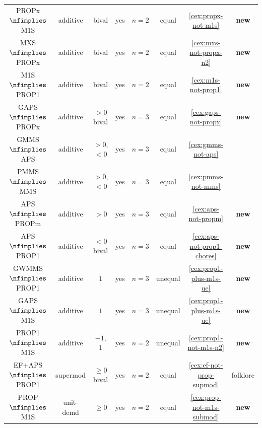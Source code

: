\begin{longtable}{cccccccc}
\\[\defaultaddspace] PROPx $\nfimplies$ M1S
    & additive & bival & yes & $n=2$ & equal & \cref{cex:propx-not-m1s} & \textbf{new}
\\[\defaultaddspace] MXS $\nfimplies$ PROPx
    & additive & bival & yes & $n=2$ & equal & \cref{cex:mxs-not-propx-n2} & \textbf{new}
\\[\defaultaddspace] M1S $\nfimplies$ PROP1
    & additive & bival & yes & $n=2$ & equal & \cref{cex:m1s-not-prop1} & \textbf{new}
%
\\\midrule GAPS $\nfimplies$ PROPx
    & additive & $> 0$ bival & yes & $n=3$ & equal & \cref{cex:gaps-not-propx} & \textbf{new}
\\[\defaultaddspace] GMMS $\nfimplies$ APS
    & additive & $> 0$, $< 0$ & yes & $n=3$ & equal & \cref{cex:gmms-not-aps} & \cite{babaioff2023fair}
\\[\defaultaddspace] PMMS $\nfimplies$ MMS
    & additive & $> 0$, $< 0$ & yes & $n=3$ & equal & \cref{cex:pmms-not-mms} & \cite{caragiannis2019unreasonable}
\\[\defaultaddspace] APS $\nfimplies$ PROPm
    & additive & $> 0$ & yes & $n=3$ & equal & \cref{cex:aps-not-propm} & \textbf{new}
\\[\defaultaddspace] APS $\nfimplies$ PROP1
    & additive & $< 0$ bival & yes & $n=3$ & equal & \cref{cex:aps-not-prop1-chores} & \textbf{new}
%
\\\midrule GWMMS $\nfimplies$ PROP1
    & additive & $1$ & yes & $n=3$ & unequal & \cref{cex:prop1-plus-m1s-ue} & \textbf{new}
\\[\defaultaddspace] GAPS $\nfimplies$ M1S
    & additive & $1$ & yes & $n=3$ & unequal & \cref{cex:prop1-plus-m1s-ue} & \textbf{new}
\\[\defaultaddspace] PROP1 $\nfimplies$ M1S
    & additive & $-1$, $1$ & yes & $n=2$ & unequal & \cref{cex:prop1-not-m1s-n2} & \textbf{new}
%
\\\midrule EF+APS $\nfimplies$ PROP1
    & supermod & $\ge 0$ bival & yes & $n=2$ & equal & \cref{cex:ef-not-prop-supmod} & folklore
\\[\defaultaddspace] PROP $\nfimplies$ M1S
    & unit-demd & $\ge 0$ & yes & $n=2$ & equal & \cref{cex:prop-not-m1s-submod} & \textbf{new}
\\ \bottomrule
\end{longtable}
\normalsize
